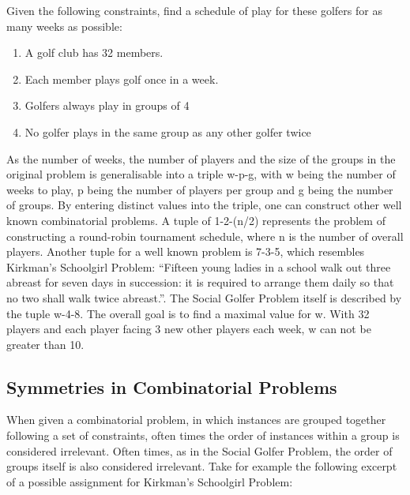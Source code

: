 \documentclass[a4paper]{scrartcl}
\begin{document}
\begin{mdframed}[skipabove=\baselineskip, skipbelow=\baselineskip, leftmargin=20, rightmargin=20]

Given the following constraints, find a schedule of play for these golfers for as many weeks as possible:

\begin{enumerate}
    \item A golf club has 32 members.
    \item Each member plays golf once in a week.
    \item Golfers always play in groups of 4
    \item No golfer plays in the same group as any other golfer twice
\end{enumerate}

\end{mdframed}

As the number of weeks, the number of players and the size of the groups in the original problem is generalisable into a triple w-p-g, with w being the number of weeks to play, p being the number of players per group and g being the number of groups. By entering distinct values into the triple, one can construct other well known combinatorial problems. A tuple of 1-2-(n/2) represents the problem of constructing a round-robin tournament schedule, where n is the number of overall players. Another tuple for a well known problem is 7-3-5, which resembles Kirkman's Schoolgirl Problem: ``Fifteen young ladies in a school walk out three abreast for seven days in succession: it is required to arrange them daily so that no two shall walk twice abreast.''. The Social Golfer Problem itself is described by the tuple w-4-8. The overall goal is to find a maximal value for w. With 32 players and each player facing 3 new other players each week, w can not be greater than 10.


\subsection{Symmetries in Combinatorial Problems}

When given a combinatorial problem, in which instances are grouped together following a set of constraints, often times the order of instances within a group is considered irrelevant. Often times, as in the Social Golfer Problem, the order of groups itself is also considered irrelevant. Take for example the following excerpt of a possible assignment for Kirkman's Schoolgirl Problem:
\end{document}
